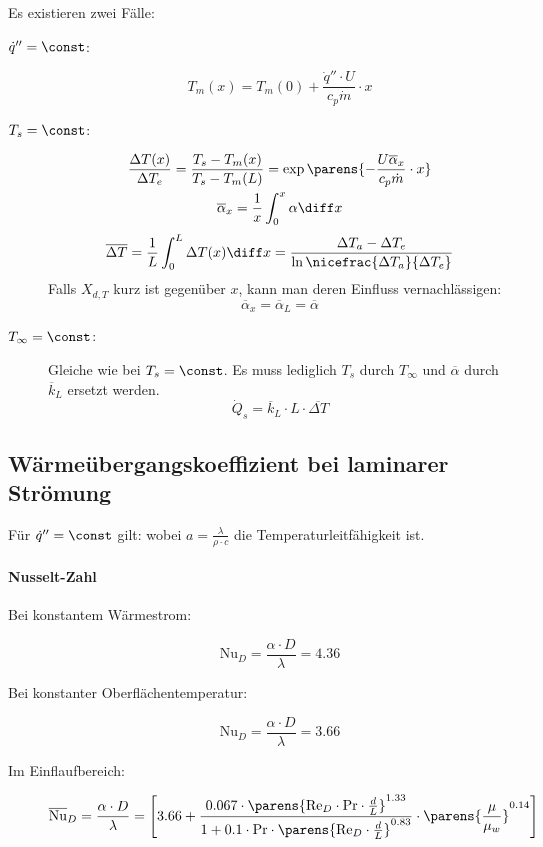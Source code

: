 		Es existieren zwei Fälle:
		\begin{description}
			\item[$\dot{q}'' = \const$:] \[
				T_m(x) = T_m(0) + \frac{ \dot{q}'' \cdot U }{ c_p \dot m } \cdot x
			\]
			\item[$T_s = \const$:] \begin{gather*}
				\frac{\Delta T(x)}{\Delta T_e} = \frac{ T_s - T_m(x) }{ T_s - T_{m}(L) } = \exp \parens{ - \frac{ U \overline{\alpha}_x }{ c_p \dot m  } \cdot x } \\
				\overline{\alpha}_x = \frac 1 x \int_0^x \alpha \diff x
			\end{gather*}
			\[
				\overline{\Delta T} = \frac 1 L \int_0^L \Delta T(x) \diff x = \frac{ \Delta T_a - \Delta T_e }{ \ln \nicefrac{ \Delta T_a }{ \Delta T_e } }
			\]
			Falls $X_{d,T}$ kurz ist gegenüber $x$, kann man deren Einfluss vernachlässigen:
			\[ \overline{\alpha}_x = \overline{\alpha}_L = \overline{\alpha} \]
			\item[$T_\infty = \const$:] Gleiche wie bei $T_s = \const$. Es muss lediglich $T_s$ durch $T_\infty$ und $\overline{\alpha}$ durch $\overline{k}_L$ ersetzt werden.
			\[
				\dot Q_s = \overline{k}_L \cdot L \cdot \overline{\Delta T}
			\]
		\end{description}

	\subsection{Wärmeübergangskoeffizient bei laminarer Strömung} %
		Für $\dot{q}'' = \const$ gilt:
		wobei $a = \frac{\lambda}{\rho \cdot c}$ die Temperaturleitfähigkeit ist.

		\paragraph{Nusselt-Zahl} %
			\begin{description}
				\item[Bei konstantem Wärmestrom:] \[
					\mathrm{Nu}_D = \frac{ \alpha \cdot D }{ \lambda } = 4.36
				\]
				\item[Bei konstanter Oberflächentemperatur:] \[
					\mathrm{Nu}_D = \frac{ \alpha \cdot D }{ \lambda } = 3.66
				\]
				\item[Im Einflaufbereich:] \[
					\overline{\mathrm{Nu}}_D = \frac{ \alpha \cdot D }{ \lambda } = \left[
						3.66 + \frac{
							0.067 \cdot \parens{ \mathrm{Re}_D \cdot \mathrm{Pr} \cdot \frac d L }^{1.33}
						}{
							1 + 0.1 \cdot \mathrm{Pr} \cdot \parens{ \mathrm{Re}_D \cdot \frac d L }^{0.83}
						} \cdot \parens{\frac{\mu}{\mu_w}}^{0.14}
					\right]
				\]
			\end{description}

